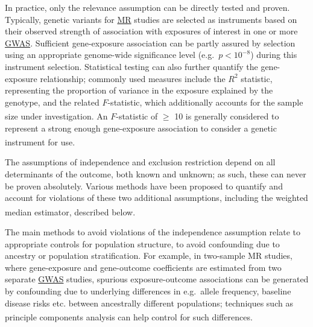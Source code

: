\documentclass[
]{article}
\begin{document}
In practice, only the relevance assumption can be directly tested and proven. Typically, genetic variants for \hyperref[acronyms_MR]{MR} studies are selected as instruments based on their observed strength of association with exposures of interest in one or more \hyperref[acronyms_GWAS]{GWAS}. Sufficient gene-exposure association can be partly assured by selection using an appropriate genome-wide significance level (e.g.~\(p < 10 ^{-8}\)) during this instrument selection. Statistical testing can also further quantify the gene-exposure relationship; commonly used measures include the \(R^2\) statistic, representing the proportion of variance in the exposure explained by the genotype, and the related \(F\)-statistic, which additionally accounts for the sample size under investigation\textsuperscript{}. An \(F\)-statistic of \(\ge\) 10 is generally considered to represent a strong enough gene-exposure association to consider a genetic instrument for use\textsuperscript{}.

The assumptions of independence and exclusion restriction depend on all determinants of the outcome, both known and unknown; as such, these can never be proven absolutely. Various methods have been proposed to quantify and account for violations of these two additional assumptions, including the weighted median estimator, described below\textsuperscript{}.

The main methods to avoid violations of the independence assumption relate to appropriate controls for population structure, to avoid confounding due to ancestry or population stratification. For example, in two-sample MR studies, where gene-exposure and gene-outcome coefficients are estimated from two separate \hyperref[acronyms_GWAS]{GWAS} studies, spurious exposure-outcome associations can be generated by confounding due to underlying differences in e.g.~allele frequency, baseline disease risks etc. between ancestrally different populations; techniques such as principle components analysis can help control for such differences\textsuperscript{}.
\end{document}
